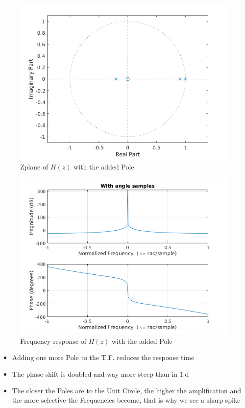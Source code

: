 \documentclass[12pt, a4paper]{article}
\begin{document}
\begin{enumerate}
\begin{enumerate}
        \begin{figure}[H]
            \centering
            \includegraphics[scale=0.9]{new_pole.png}
            \caption{Zplane of \(H(z)\) with the added Pole}
        \end{figure}

        \begin{figure}[H]
            \centering
            \includegraphics[scale=0.9]{new_pole_freqz.png}
            \caption{Frequency response of \(H(z)\) with the added Pole}
        \end{figure}

        \begin{itemize}
            \item Adding one more Pole to the T.F. reduces the response time
            \item The phase shift is doubled and way more steep than in 1.d
            \item The closer the Poles are to the Unit Circle, the higher the amplification and the more selective the Frequencies become,
            that is why we see a sharp spike
        \end{itemize}
        

\end{enumerate}
\end{enumerate}
\end{document}
